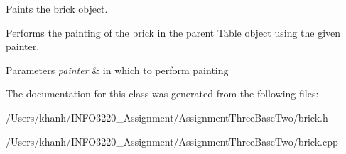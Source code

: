 Paints the brick object. 

Performs the painting of the brick in the parent Table object using the given painter.


\begin{DoxyParams}{Parameters}
{\em painter} & in which to perform painting \\
\hline
\end{DoxyParams}


The documentation for this class was generated from the following files\+:\begin{DoxyCompactItemize}
\item 
/\+Users/khanh/\+I\+N\+F\+O3220\+\_\+\+Assignment/\+Assignment\+Three\+Base\+Two/brick.\+h\item 
/\+Users/khanh/\+I\+N\+F\+O3220\+\_\+\+Assignment/\+Assignment\+Three\+Base\+Two/brick.\+cpp\end{DoxyCompactItemize}
